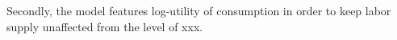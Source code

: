 Secondly, the model features log-utility of consumption in order to keep labor supply unaffected from the level of xxx. 
